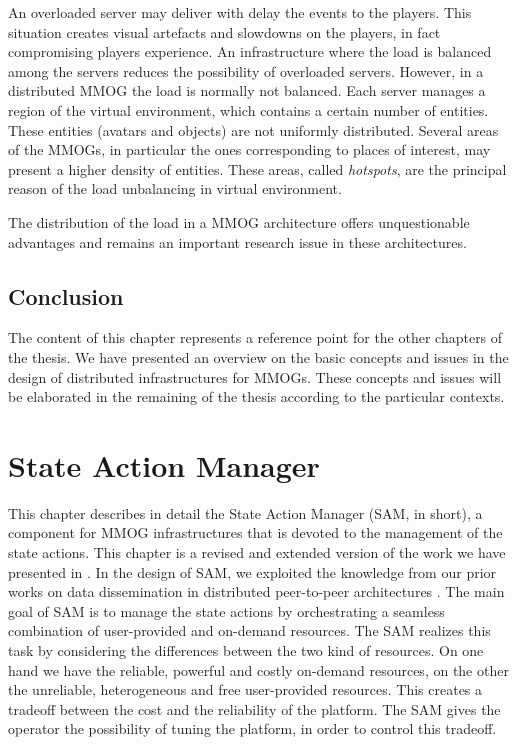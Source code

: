 \documentclass[final,10pt,a5paper]{phdimt}
\theoremstyle{definition}
\begin{document}
An overloaded server may deliver with delay the events to the players.
This situation creates visual artefacts and slowdowns on the players, in fact compromising players experience.
An infrastructure where the load is balanced among the servers reduces the possibility of overloaded servers.
However, in a distributed MMOG the load is normally not balanced.
Each server manages a region of the virtual environment, which contains a certain number of entities. 
These entities (avatars and objects) are not uniformly distributed.
Several areas of the MMOGs, in particular the ones corresponding to places of interest, may present a higher density of entities.
These areas, called \textit{hotspots}, are the principal reason of the load unbalancing in virtual environment.


The distribution of the load in a MMOG architecture offers unquestionable advantages and remains an important research issue in these architectures. 



\section{Conclusion}
The content of this chapter represents a reference point for the other chapters of the thesis.
We have presented an overview on the basic concepts and issues in the design of distributed infrastructures for MMOGs.
These concepts and issues will be elaborated in the remaining of the thesis according to the particular contexts.






\clearpage{}
\clearpage{}

\chapter{State Action Manager}
\label{chap:sam}



This chapter describes in detail the State Action Manager (SAM, in short), a component for MMOG infrastructures that is devoted to the management of the state actions.
This chapter is a revised and extended version of the work we have presented in \cite{pos}.
In the design of SAM, we exploited the knowledge from our prior works on data dissemination in distributed peer-to-peer architectures \cite{carlini2011probabilistic, carlini2010reducing}.
The main goal of SAM is to manage the state actions by orchestrating a seamless combination of user-provided and on-demand resources.
The SAM realizes this task by considering the differences between the two kind of resources. On one hand we have the reliable, powerful and costly on-demand resources, on the other the unreliable, heterogeneous and free user-provided resources. This creates a tradeoff between the cost and the reliability of the platform. The SAM gives the operator the possibility of tuning the platform, in order to control this tradeoff.
\end{document}
